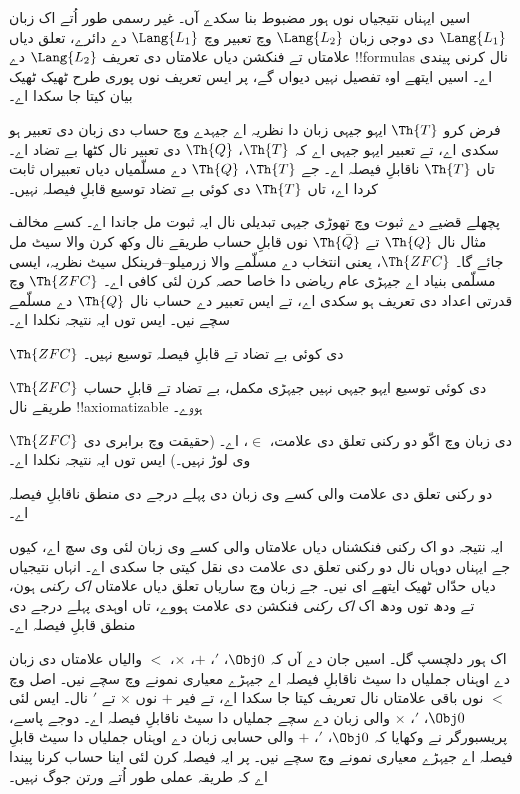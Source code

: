 \documentclass[../../../include/open-logic-section]{subfiles}
\begin{document}


اسیں ایہناں نتیجیاں نوں ہور مضبوط بنا سکدے آں۔ غیر رسمی
طور اُتے اک زبان $\Lang{L_1}$ دی دوجی زبان $\Lang{L_2}$ وچ
تعبیر وچ $\Lang{L_1}$ دے دائرے، تعلق دیاں علامتاں تے فنکشن
دیاں علامتاں دی تعریف $\Lang{L_2}$ دے !!{formula}s نال کرنی
پیندی اے۔ اسیں ایتھے اوہ تفصیل نہیں دیواں گے، پر ایس تعریف
نوں پوری طرح ٹھیک ٹھیک بیان کیتا جا سکدا اے۔

\begin{thm}
فرض کرو $\Th{T}$ ایہو جیہی زبان دا نظریہ اے جیہدے وچ
حساب دی زبان دی تعبیر ہو سکدی اے، تے تعبیر ایہو جیہی اے کہ
$\Th{T}$، $\Th{Q}$ دی تعبیر نال کٹھا بے تضاد اے۔ تاں
$\Th{T}$ ناقابلِ فیصلہ اے۔ جے $\Th{T}$، $\Th{Q}$ دے
مسلّمیاں دیاں تعبیراں ثابت کردا اے، تاں $\Th{T}$ دی کوئی
بے تضاد توسیع قابلِ فیصلہ نہیں۔
\end{thm}

پچھلے قضیے دے ثبوت وچ تھوڑی جیہی تبدیلی نال ایہ ثبوت مل
جاندا اے۔ کسے مخالف مثال نال $\Th{Q}$ تے $\Th{\bar Q}$ نوں
قابلِ حساب طریقے نال وکھ کرن والا سیٹ مل جائے گا۔ $\Th{ZFC}$،
یعنی انتخاب دے مسلّمے والا زرمیلو--فرینکل سیٹ نظریہ، ایسی
مسلّمی بنیاد اے جیہڑی عام ریاضی دا خاصا حصہ کرن لئی کافی اے۔
$\Th{ZFC}$ وچ قدرتی اعداد دی تعریف ہو سکدی اے، تے ایس تعبیر
دے حساب نال $\Th{Q}$ دے مسلّمے سچے نیں۔ ایس توں ایہ نتیجہ
نکلدا اے۔

\begin{cor}
$\Th{ZFC}$ دی کوئی بے تضاد تے قابلِ فیصلہ توسیع نہیں۔
\end{cor}

\begin{cor}
$\Th{ZFC}$ دی کوئی توسیع ایہو جیہی نہیں جیہڑی مکمل، بے تضاد تے
قابلِ حساب طریقے نال !!{axiomatizable} ہووے۔
\end{cor}

$\Th{ZFC}$ دی زبان وچ اکّو دو رکنی تعلق دی علامت، $\in$، اے۔
(حقیقت وچ برابری دی وی لوڑ نہیں۔) ایس توں ایہ نتیجہ نکلدا اے۔

\begin{cor}
دو رکنی تعلق دی علامت والی کسے وی زبان دی پہلے درجے دی
منطق ناقابلِ فیصلہ اے۔
\end{cor}

ایہ نتیجہ دو اک رکنی فنکشناں دیاں علامتاں والی کسے وی زبان
لئی وی سچ اے، کیوں جے ایہناں دوہاں نال دو رکنی تعلق دی علامت
دی نقل کیتی جا سکدی اے۔ انہاں نتیجیاں دیاں حدّاں ٹھیک ایتھے
ای نیں۔ جے زبان وچ ساریاں تعلق دیاں علامتاں \emph{اک رکنی} ہون،
تے ودھ توں ودھ اک \emph{اک رکنی} فنکشن دی علامت ہووے، تاں
اوہدی پہلے درجے دی منطق قابلِ فیصلہ اے۔

اک ہور دلچسپ گل۔ اسیں جان دے آں کہ $\Obj 0$، $'$، $+$،
$\times$، $<$ والیاں علامتاں دی زبان دے اوہناں جملیاں دا سیٹ
ناقابلِ فیصلہ اے جیہڑے معیاری نمونے وچ سچے نیں۔ اصل وچ $<$
نوں باقی علامتاں نال تعریف کیتا جا سکدا اے، تے فیر $+$ نوں
$\times$ تے $'$ نال۔ ایس لئی $\Obj 0$، $'$، $\times$ والی
زبان دے سچے جملیاں دا سیٹ ناقابلِ فیصلہ اے۔ دوجے پاسے،
پریسبورگر نے وکھایا کہ $\Obj 0$، $'$، $+$ والی حسابی زبان
دے اوہناں جملیاں دا سیٹ قابلِ فیصلہ اے جیہڑے معیاری نمونے وچ
سچے نیں۔ پر ایہ فیصلہ کرن لئی اینا حساب کرنا پیندا اے کہ
طریقہ عملی طور اُتے ورتن جوگ نہیں۔
\end{document}
